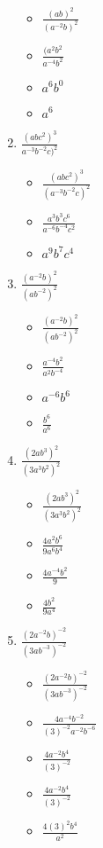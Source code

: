 \documentclass{article}
\begin{document}
\begin{enumerate}
  \begin{itemize}
  \item {\Large $\frac{(ab)^{2}}{(a^{-2}b)^{2}}$}
  \item {\Large $\frac{(a^{2}b^{2}}{a^{-4}b^{2}}$}
  \item $a^{6}b^{0}$
  \item $a^{6}$
  \end{itemize}
\item {\Large $\frac{(abc^{2})^{3}}{a^{-3}b^{-2}c)^{2}}$}
  \begin{itemize}
  \item {\Large $\frac{(abc^{2})^{3}}{(a^{-3}b^{-2}c)^{2}}$}
  \item {\Large $\frac{a^{3}b^{3}c^{6}}{a^{-6}b^{-4}c^{2}}$}
  \item  $a^{9}b^{7}c^{4}$
  \end{itemize}
\item {\Large $\frac{(a^{-2}b)^{2}}{(ab^{-2})^{2}}$}
  \begin{itemize}
  \item {\Large $\frac{(a^{-2}b)^{2}}{(ab^{-2})^{2}}$}
  \item {\Large $\frac{a^{-4}b^{2}}{a^{2}b^{-4}}$}
  \item $a^{-6}b^{6}$
  \item {\Large $\frac{b^{6}}{a^{6}}$}
  \end{itemize}
\item {\Large $\frac{(2ab^{3})^{2}}{(3a^{3}b^{2})^{2}}$}
  \begin{itemize}
  \item {\Large $\frac{(2ab^{3})^{2}}{(3a^{3}b^{2})^{2}}$}
  \item {\Large $\frac{4a^{2}b^{6}}{9a^{6}b^{4}}$}
  \item {\Large $\frac{4a^{-4}b^{2}}{9}$}
  \item {\Large $\frac{4b^{2}}{9a^{4}}$}
  \end{itemize}
\item {\Large $\frac{(2a^{-2}b)^{-2}}{(3ab^{-3})^{-2}}$}
  \begin{itemize}
  \item {\Large $\frac{(2a^{-2}b)^{-2}}{(3ab^{-3})^{-2}}$}
  \item {\Large $\frac{4a^{-4}b^{-2}}{(3)^{-2}a^{-2}b^{-6}}$}
  \item {\Large $\frac{4a^{-2}b^{4}}{(3)^{-2}}$}
  \item {\Large $\frac{4a^{-2}b^{4}}{(3)^{-2}}$}
  \item {\Large $\frac{4(3)^{2}b^{4}}{a^{2}}$}

\end{itemize}
\end{enumerate}
\end{document}
